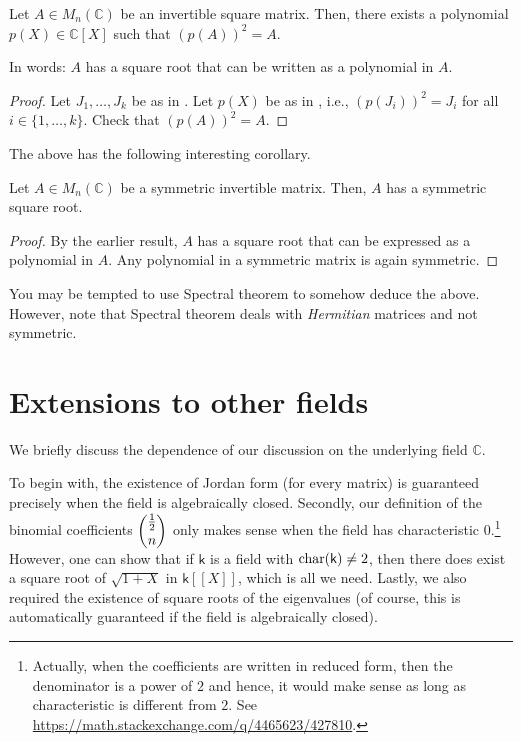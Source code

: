 \documentclass[12pt]{article}
\begin{document}
\begin{thm}
	Let $A \in M_{n}(\mathbb{C})$ be an invertible square matrix. Then, there exists a polynomial $p(X) \in \mathbb{C}[X]$ such that $(p(A))^{2} = A$. 

	In words: $A$ has a square root that can be written as a polynomial in $A$.
\end{thm}
\begin{proof} 
	Let $J_{1}, \ldots, J_{k}$ be as in . Let $p(X)$ be as in , i.e., $(p(J_{i}))^{2} = J_{i}$ for all $i \in \{1, \ldots, k\}$. Check that $(p(A))^{2} = A$.
\end{proof}

The above has the following interesting corollary.
\begin{cor}
	Let $A \in M_{n}(\mathbb{C})$ be a symmetric invertible matrix. Then, $A$ has a symmetric square root.
\end{cor}
\begin{proof} 
	By the earlier result, $A$ has a square root that can be expressed as a polynomial in $A$. Any polynomial in a symmetric matrix is again symmetric.
\end{proof}

\begin{rem}
	You may be tempted to use Spectral theorem to somehow deduce the above. However, note that Spectral theorem deals with \emph{Hermitian} matrices and not symmetric.
\end{rem}

\section{Extensions to other fields}

We briefly discuss the dependence of our discussion on the underlying field $\mathbb{C}$. 

To begin with, the existence of Jordan form (for every matrix) is guaranteed precisely when the field is algebraically closed. Secondly, our definition of the binomial coefficients $\dbinom{\frac{1}{2}}{n}$ only makes sense when the field has characteristic $0$.\footnote{Actually, when the coefficients are written in reduced form, then the denominator is a power of $2$ and hence, it would make sense as long as characteristic is different from $2$. See \url{https://math.stackexchange.com/q/4465623/427810}.} However, one can show that if $\mathsf{k}$ is a field with $\operatorname{char}(\mathsf{k}) \neq 2$, then there does exist a square root of $\sqrt{1 + X}$ in $\mathsf{k}[\![X]\!]$, which is all we need. Lastly, we also required the existence of square roots of the eigenvalues (of course, this is automatically guaranteed if the field is algebraically closed). 
\end{document}
